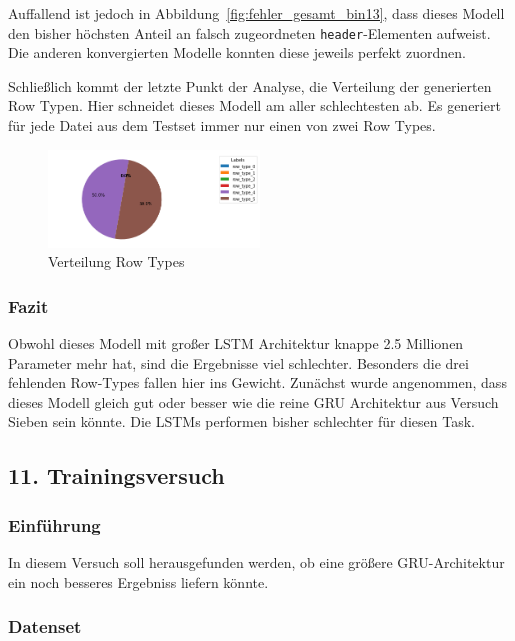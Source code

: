 \documentclass[pdftex,a4paper,halfparskip, article]{scrartcl}
\begin{document}
Auffallend ist jedoch in Abbildung~\ref{fig:fehler_gesamt_bin13}, dass dieses Modell den bisher höchsten Anteil an falsch zugeordneten \texttt{header}-Elementen aufweist. Die anderen konvergierten Modelle konnten diese jeweils perfekt zuordnen. 

Schließlich kommt der letzte Punkt der Analyse, die Verteilung der generierten Row Typen. Hier schneidet dieses Modell am aller schlechtesten ab. Es generiert für jede Datei aus dem Testset immer nur einen von zwei Row Types. 

\begin{figure}[h]
\label{fig:bin13_row_type}

\centering
\includegraphics[width=0.5\textwidth]{predictions_bin13_predicted_row_type_distribution}
\caption{Verteilung Row Types}
\end{figure}


\subsubsection*{Fazit}

Obwohl dieses Modell mit großer LSTM Architektur knappe 2.5 Millionen Parameter mehr hat, sind die Ergebnisse viel schlechter. Besonders die drei fehlenden Row-Types fallen hier ins Gewicht. Zunächst wurde angenommen, dass dieses Modell gleich gut oder besser wie die reine GRU Architektur aus Versuch Sieben sein könnte. Die LSTMs performen bisher schlechter für diesen Task. 

\subsection{11. Trainingsversuch}\label{sec:elf}


\subsubsection*{Einführung}
In diesem Versuch soll herausgefunden werden, ob eine größere GRU-Architektur ein noch besseres Ergebniss liefern könnte.

\subsubsection*{Datenset}
\end{document}
